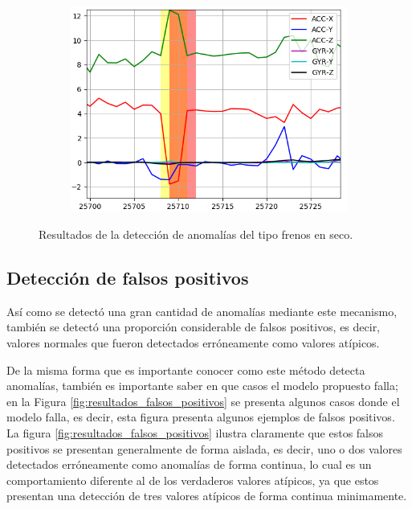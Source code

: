 \begin{figure}[H]
{\begin{varwidth}{\textwidth}
\begin{subfigure}[h]{0.45\textwidth}
            \includegraphics[width=\textwidth]{imagenes/Cap5/freno3}
        \end{subfigure} 
        \end{varwidth}}
        \caption{Resultados de la detecci\'{o}n de anomal\'{i}as del tipo frenos en seco.}
		\label{fig:resultados_frenos}
    \end{figure}


\subsection{Detecci\'{o}n de falsos positivos}

As\'{i} como se detect\'{o} una gran cantidad de anomal\'{i}as mediante este mecanismo, tambi\'{e}n se detect\'{o} una proporci\'{o}n considerable de falsos positivos, es decir, valores normales que fueron detectados err\'{o}neamente como valores at\'{i}picos.

\vspace{5mm} %

De la misma forma que es importante conocer como este m\'{e}todo detecta anomal\'{i}as, tambi\'{e}n es importante saber en que casos el modelo propuesto falla; en la Figura \ref{fig:resultados_falsos_positivos} se presenta algunos casos donde el modelo falla, es decir, esta figura presenta algunos ejemplos de falsos positivos. La figura \ref{fig:resultados_falsos_positivos} ilustra claramente que estos falsos positivos se presentan generalmente de forma aislada, es decir, uno o dos valores detectados err\'{o}neamente como anomal\'{i}as de forma continua, lo cual es un comportamiento diferente al de los verdaderos valores at\'{i}picos, ya que estos presentan una detecci\'{o}n de tres valores at\'{i}picos de forma continua minimamente.

